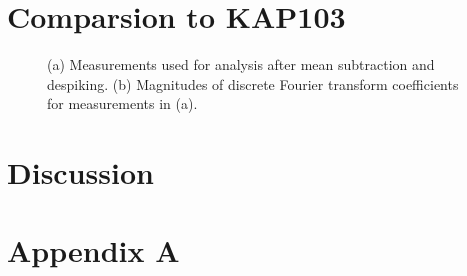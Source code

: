 \documentclass[draft,linenumbers]{agujournal2018}
\begin{document}
\clearpage

\section{Comparsion to KAP103}

\begin{figure}
     \hspace{10pt}
     \caption{(a) Measurements used for analysis after mean subtraction and despiking. (b) Magnitudes of discrete Fourier transform coefficients for measurements in (a).}
  \label{fig:timeseries}
\end{figure}

\section{Discussion}

\section{Appendix A}
\end{document}
